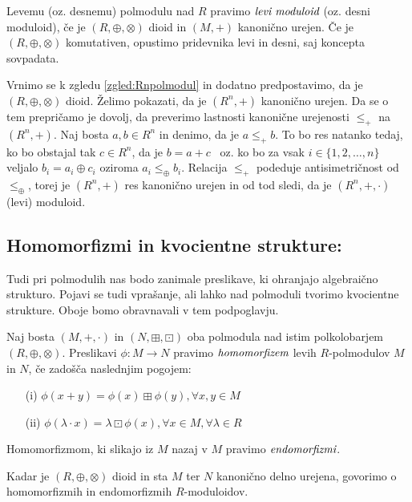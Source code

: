 \documentclass[mat1]{fmfdelo}
\newcommand{\pojem}[1]{\ensuremath{\emph{#1}}}
\newcommand{\map}[3]{\ensuremath{{#1}:{#2}\rightarrow{#3}}}
\begin{document}
\begin{definicija}
	Levemu (oz. desnemu) polmodulu nad $R$ pravimo \pojem{levi~moduloid} (oz. desni moduloid), če je $(R, \oplus, \otimes)$ dioid in $(M, +)$ kanonično urejen. Če je $(R, \oplus, \otimes)$ komutativen, opustimo pridevnika levi in desni, saj koncepta sovpadata.
\end{definicija}

\begin{zgled}
	Vrnimo se k zgledu \ref{zgled:Rnpolmodul} in dodatno predpostavimo, da je $(R, \oplus, \otimes)$ dioid. Želimo pokazati, da je $(R^n, +)$ kanonično urejen.
	Da se o tem prepričamo je dovolj, da preverimo lastnosti kanonične urejenosti $\leq_+$ na $(R^n, +)$. Naj bosta $a, b \in R^n$ in denimo, da je $a \leq_+ b$. To bo res natanko tedaj, ko bo obstajal tak $c\in R^n$, da je $b = a + c$~ oz. ko bo za vsak $i\in \{1, 2, \ldots, n\}$ veljalo $b_i = a_i \oplus c_i$ oziroma $a_i \leq_\oplus b_i$. Relacija $\leq_+$ podeduje antisimetričnost od $\leq_\oplus$, torej je $(R^n, +)$ res kanonično urejen in od tod sledi, da je $(R^n, +, \cdot)$ (levi) moduloid.
\end{zgled}

\subsection{Homomorfizmi in kvocientne strukture:}\label{subsect:homomorphsemimodule}
Tudi pri polmodulih nas bodo zanimale preslikave, ki ohranjajo algebraično strukturo. Pojavi se tudi vprašanje, ali lahko nad polmoduli tvorimo kvocientne strukture. Oboje bomo obravnavali v tem podpoglavju.

\begin{definicija}
	Naj bosta $(M, +, \cdot)$ in $(N, \boxplus, \boxdot)$ oba polmodula nad istim polkolobarjem $(R, \oplus, \otimes)$. Preslikavi \map{\phi}{M}{N} pravimo \pojem{homomorfizem} levih $R$-polmodulov $M$ in $N$, če zadošča naslednjim pogojem: \begin{enumerate}
		\item[(i)] $\phi(x + y) = \phi(x)\boxplus\phi(y), \forall x, y\in M$
		\item[(ii)] $\phi(\lambda\cdot x) = \lambda \boxdot \phi(x), \forall x\in M, \forall \lambda\in R$
	\end{enumerate}
Homomorfizmom, ki slikajo iz $M$ nazaj v $M$ pravimo \pojem{endomorfizmi}.

Kadar je $(R, \oplus, \otimes)$ dioid in sta $M$ ter $N$ kanonično delno urejena, govorimo o homomorfizmih in endomorfizmih $R$-moduloidov.
\end{definicija}
\end{document}
